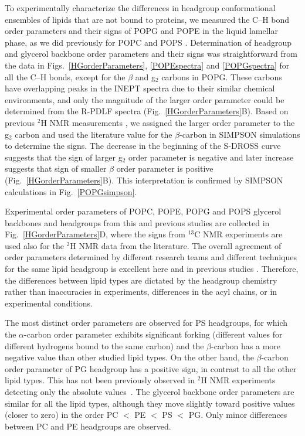 \documentclass[aps,prl,superscriptaddress,twocolumn]{revtex4}
\begin{document}
To experimentally characterize the differences in headgroup conformational ensembles of lipids that are not
bound to proteins, we measured the C--H bond order parameters
and their signs of POPG and POPE in the liquid lamellar phase, as we did previously for POPC and POPS \cite{ferreira13,ferreira16,antila19}.
Determination of headgroup and glycerol backbone order parameters and their signs
was straightforward from the data in Figs.~\ref{HGorderParameters}, \ref{POPEspectra} and \ref{POPGspectra}
for all the C--H bonds, except for the $\beta$ and g$_2$ carbons in POPG.
These carbons have overlapping peaks in the INEPT spectra due to their similar chemical environments,
and only the magnitude of the larger order parameter could be determined from the R-PDLF spectra (Fig.~\ref{HGorderParameters}B).
Based on previous $^2$H NMR measurements \cite{wohlgemuth80,gally81,borle85},
we assigned the larger order parameter to the g$_2$ carbon
and used the literature value for the $\beta$-carbon in SIMPSON simulations to determine the signs.
The decrease in the beginning of the S-DROSS curve suggests that the sign of larger g$_2$ order parameter
is negative and later increase suggests that sign of smaller $\beta$ order parameter is positive (Fig.~\ref{HGorderParameters}B).
This interpretation is confirmed by SIMPSON calculations in Fig.~\ref{POPGsimpson}.

Experimental order parameters of POPC, POPE, POPG and POPS glycerol backbones and headgroups from this and previous studies are collected in Fig.~\ref{HGorderParameters}D, where the signs from $^{13}$C NMR experiments are used also for the $^2$H NMR data from the literature. The overall agreement of order parameters determined by different research teams and different techniques for the same lipid headgroup is excellent here and in previous studies \cite{botan15,ollila16,antila19}. Therefore, the differences between lipid types are dictated by the headgroup chemistry rather than inaccuracies in experiments, differences in the acyl chains, or in experimental conditions.


The most distinct order parameters are observed for PS headgroups, for which the $\alpha$-carbon order parameter exhibits significant forking (different values for different hydrogens bound to the same carbon) and the $\beta$-carbon has a more negative value than other studied lipid types. On the other hand, the $\beta$-carbon order parameter of PG headgroup has a positive sign, in contrast to all the other lipid types. This has not been previously observed  in $^2$H NMR experiments detecting only the absolute values~\cite{wohlgemuth80,gally81,borle85}. The glycerol backbone order parameters are similar for all the lipid types, although they move slightly toward positive values (closer to zero) in the order PC $<$ PE $<$ PS $<$ PG. Only minor differences between PC and PE headgroups are observed.
\end{document}
